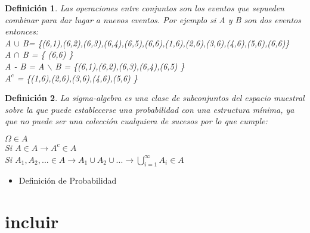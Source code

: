 \documentclass[12pt]{article}
\newtheorem{Def}{\quad Definición}
\begin{document}
\begin{Def} 
Las operaciones entre conjuntos son los eventos que sepueden combinar para dar lugar a nuevos eventos. Por ejemplo si A y B son dos eventos entonces: \\
A $\cup$ B= \{(6,1),(6,2),(6,3),(6,4),(6,5),(6,6),(1,6),(2,6),(3,6),(4,6),(5,6),(6,6)\} \\
A $\cap$ B = \{ (6,6) \} \\
A - B = A $\backslash$ B = \{(6,1),(6,2),(6,3),(6,4),(6,5) \} \\
$A^c$ = \{(1,6),(2,6),(3,6),(4,6),(5,6) \}
\end{Def}





\begin{Def} 
La sigma-algebra es una clase de subconjuntos del espacio muestral sobre la que puede establecerse una probabilidad con una estructura mínima, ya que no puede ser una colección cualquiera de sucesos por lo que cumple:

$ \Omega \in A$ \\
Si $A \in A \rightarrow A^c \in A$ \\
Si $A_{1}, A_{2},... \in A \rightarrow A_{1} \cup A_{2} \cup ... \rightarrow \bigcup_{i=1}^{ \infty} A_{i} \in A $
\end{Def}


\begin{itemize}

\item Definición de Probabilidad

\end{itemize}


\section{ incluir}
\end{document}
